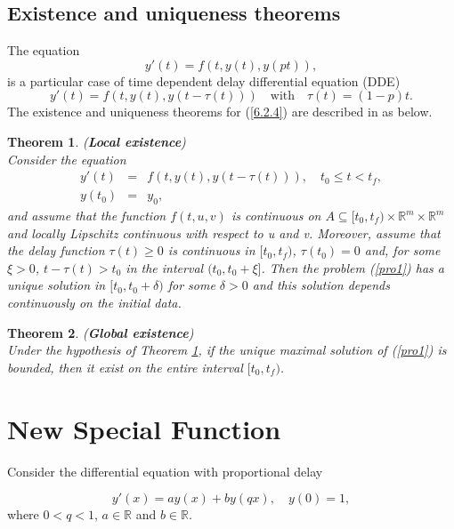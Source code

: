 \documentclass[12pt]{article}
\newtheorem{The}{Theorem}[section]
\numberwithin{equation}{section}
\begin{document}
\subsection{Existence and uniqueness theorems}\label{Thm}
\par The equation
\begin{equation}
y'(t) = f\left(t, y(t), y(pt)\right),
\end{equation}
is a particular case of time dependent delay differential equation (DDE)
\begin{equation}
y'(t) = f\left(t, y(t), y\left(t-\tau(t)\right)\right)\quad \textrm{with}\quad\tau(t)=(1-p)t. \label{6.2.4}
\end{equation}
The existence and uniqueness theorems for (\ref{6.2.4}) are described in \cite{Bellen} as below.

\begin{The}(\textbf{Local existence})\label{th1}\\
Consider the equation
\begin{eqnarray}
y'(t)&=& f\left(t, y(t), y\left(t-\tau(t)\right)\right),\quad t_0 \leq t < t_f,\nonumber\\
y(t_0)&=& y_0,\label{pro1}
\end{eqnarray}
and assume that the function $f(t,u,v)$ is continuous on $A \subseteq [t_0,t_f)\times\mathbb{R}^m\times\mathbb{R}^m$ and locally Lipschitz continuous with respect to u and v. Moreover, assume that the delay function $\tau(t)\geq 0$ is continuous in $[t_0,t_f)$, $\tau(t_0)=0$ and, for some $\xi > 0 $, $t-\tau(t) > t_0$ in the interval $(t_0, t_0+\xi]$. Then the problem (\ref{pro1}) has a unique solution in $[t_0,t_0+\delta)$ for some $\delta >0$ and this solution depends continuously on the initial data.
\end{The}

\begin{The}(\textbf{Global existence})\label{th2}\\
Under the hypothesis of Theorem \ref{th1}, if the unique maximal solution of (\ref{pro1}) is bounded, then it exist on the entire interval $[t_0,t_f)$.
\end{The}

\section{New Special Function}\label{nsf}

Consider the differential equation with proportional delay 

\begin{equation}
y'(x) = ay(x)+ by(q x),\quad y(0)= 1, \label{6.3.1}
\end{equation}
where  $0<q<1$, $a \in \mathbb{R}$ and $b \in \mathbb{R}$.
\end{document}
